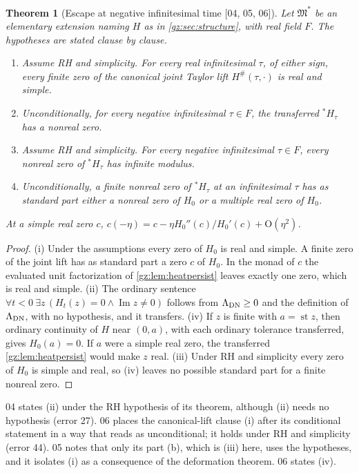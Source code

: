\documentclass[11pt,a4paper]{article}
\numberwithin{equation}{section}
\newtheorem{theorem}{Theorem}[section]
\theoremstyle{definition}
\theoremstyle{remark}
\renewcommand{\Im}{\operatorname{Im}}
\newcommand{\st}{\operatorname{st}}
\newcommand{\src}[1]{\textup{[#1]}}
\newcommand{\bigO}{\mathrm{O}}
\begin{document}
\begin{theorem}[Escape at negative infinitesimal time \src{04, 05, 06}]\label{gz:thm:escape}
Let $\mathfrak M^*$ be an elementary extension naming $H$ as in
\cref{gz:sec:structure}, with real field $F$. The hypotheses are stated
clause by clause.
\begin{enumerate}[label=(\roman*)]
\item \emph{Assume RH and simplicity.} For every real infinitesimal $\tau$, of
 either sign, every finite zero of the canonical joint Taylor lift
 $H^\#(\tau,\cdot)$ is real and simple.
\item \emph{Unconditionally,} for every negative infinitesimal $\tau\in F$, the
 transferred ${}^*H_\tau$ has a nonreal zero.
\item \emph{Assume RH and simplicity.} For every negative infinitesimal
 $\tau\in F$, every nonreal zero of ${}^*H_\tau$ has infinite modulus.
\item \emph{Unconditionally,} a finite nonreal zero of ${}^*H_\tau$ at an
 infinitesimal $\tau$ has as standard part either a nonreal zero of $H_0$ or
 a multiple real zero of $H_0$.
\end{enumerate}
At a simple real zero $c$, $c(-\eta)=c-\eta H_0''(c)/H_0'(c)+\bigO(\eta^2)$.
\end{theorem}
\begin{proof}
(i) Under the assumptions every zero of $H_0$ is real and simple. A finite
zero of the joint lift has as standard part a zero $c$ of $H_0$. In the monad
of $c$ the evaluated unit factorization of \cref{gz:lem:heatpersist} leaves
exactly one zero, which is real and simple.
(ii) The ordinary sentence $\forall t<0\ \exists z\,(H_t(z)=0\wedge\Im z\ne0)$
follows from $\Lambda_{\rm DN}\ge0$ and the definition of $\Lambda_{\rm DN}$, with no
hypothesis, and it transfers.
(iv) If $z$ is finite with $a=\st z$, then ordinary continuity of $H$ near
$(0,a)$, with each ordinary tolerance transferred, gives $H_0(a)=0$. If $a$
were a simple real zero, the transferred \cref{gz:lem:heatpersist} would
make $z$ real.
(iii) Under RH and simplicity every zero of $H_0$ is simple and real, so (iv)
leaves no possible standard part for a finite nonreal zero.
\end{proof}
04 states (ii) under the RH hypothesis of its theorem, although (ii) needs
no hypothesis (error 27). 06 places the canonical-lift clause (i) after its
conditional statement in a way that reads as unconditional; it holds under
RH and simplicity (error 44). 05 notes that only its part (b), which is
(iii) here, uses the hypotheses, and it isolates (i) as a consequence of the
deformation theorem. 06 states (iv).
\end{document}
